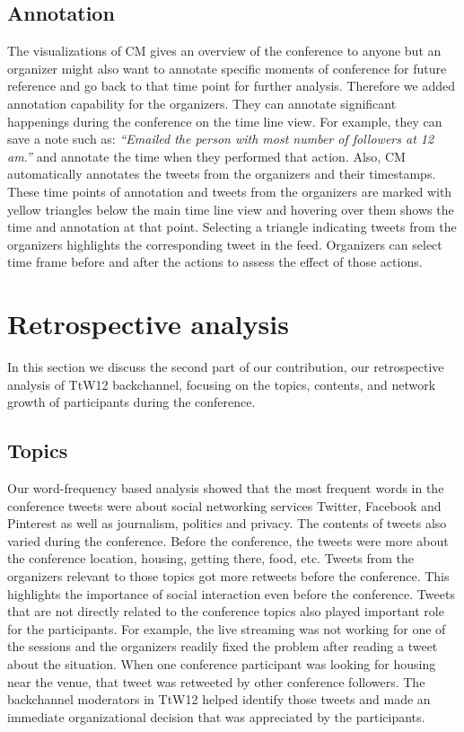 \documentclass[conference,final]{IEEEtran}
\begin{document}
\subsection{Annotation} 
The visualizations of CM gives an overview of the conference to anyone but an organizer might also want to annotate specific moments of conference for future reference and go back to that time point for further analysis. Therefore we added annotation capability for the organizers. They can annotate significant happenings during the conference on the time line view. For example, they can save a note such as: \textit{``Emailed the person with most number of followers at 12 am.''} and annotate the time when they performed that action. Also, CM automatically annotates the tweets from the organizers and their timestamps. These time points of annotation and tweets from the organizers are marked with yellow triangles below the main time line view and hovering over them shows the time and annotation at that point. Selecting a triangle indicating tweets from the organizers highlights the corresponding tweet in the feed. Organizers can select time frame before and after the actions to assess the effect of those actions. 

\section{Retrospective analysis}
In this section we discuss the second part of our contribution, our retrospective analysis of TtW12 backchannel, focusing on the topics, contents, and network growth of participants during the conference.

\subsection{Topics}
Our word-frequency based analysis showed that the most frequent words in the conference tweets were about social networking services Twitter, Facebook and Pinterest as well as journalism, politics and privacy. The contents of tweets also varied during the conference. Before the conference, the tweets were more about the conference location, housing, getting there, food, etc. Tweets from the organizers relevant to those topics got more retweets before the conference. This highlights the importance of social interaction even before the conference. Tweets that are not directly related to the conference topics also played important role for the participants. For example, the live streaming was not working for one of the sessions and the organizers readily fixed the problem after reading a tweet about the situation. When one conference participant was looking for housing near the venue, that tweet was retweeted by other conference followers. The backchannel moderators in TtW12 helped identify those tweets and made an immediate organizational decision that was appreciated by the participants.
\end{document}
